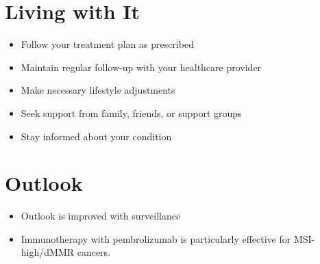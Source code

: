 \section{Living with It}
\begin{itemize}[noitemsep]
  \item Follow your treatment plan as prescribed
  \item Maintain regular follow-up with your healthcare provider
  \item Make necessary lifestyle adjustments
  \item Seek support from family, friends, or support groups
  \item Stay informed about your condition
\end{itemize}
\section{Outlook}
\begin{itemize}[noitemsep]
  \item Outlook is improved with surveillance
  \item Immunotherapy with pembrolizumab is particularly effective for MSI-high/dMMR cancers.
\end{itemize}
